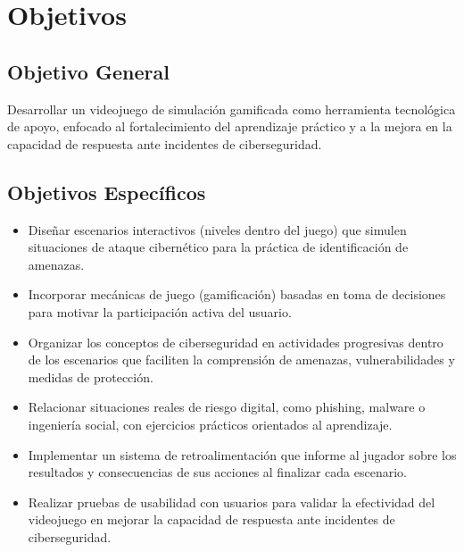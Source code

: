 \section{Objetivos}

\subsection{Objetivo General}

Desarrollar un videojuego de simulación gamificada como herramienta tecnológica de apoyo, enfocado al fortalecimiento del aprendizaje
práctico y a la mejora en la capacidad de respuesta ante incidentes de ciberseguridad.

\subsection{Objetivos Específicos}

\begin{itemize}
    \item Diseñar escenarios interactivos (niveles dentro del juego) que simulen situaciones de ataque cibernético para la práctica de identificación de amenazas.
    \item Incorporar mecánicas de juego (gamificación) basadas en toma de decisiones para motivar la participación activa del usuario.
    \item Organizar los conceptos de ciberseguridad en actividades progresivas dentro de los escenarios que faciliten la comprensión de amenazas, vulnerabilidades y medidas de protección.
    \item Relacionar situaciones reales de riesgo digital, como phishing, malware o ingeniería social, con ejercicios prácticos orientados al aprendizaje.
    \item Implementar un sistema de retroalimentación  que informe al jugador sobre los resultados y consecuencias de sus acciones al finalizar cada escenario.
    \item Realizar pruebas de usabilidad con usuarios para validar la efectividad del videojuego en mejorar la capacidad de respuesta ante incidentes de ciberseguridad.
\end{itemize}
